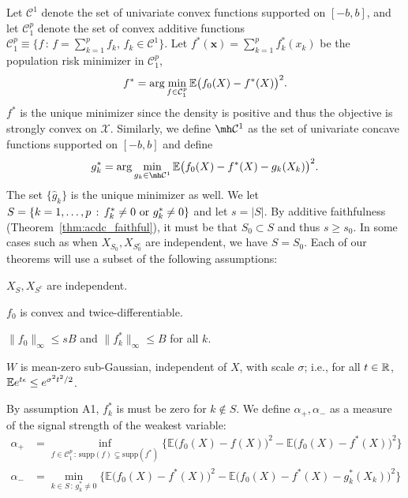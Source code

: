 Let $\mathcal{C}^1$ denote the set of univariate convex functions
supported on $[-b,b]$, 
and let  $\mathcal{C}_1^{p}$ denote the set of convex additive functions
$\mathcal{C}_1^p \equiv \{ f \,:\, f = \sum_{k=1}^p f_k, \,
   f_k \in \mathcal{C}^1 \} $.  
Let $f^*(\mathbf{x}) = \sum_{k=1}^p f^*_k(x_k)$ be the population risk
minimizer in $\mathcal{C}_1^p$, 
\begin{equation}
f^* = \arg\min_{f \in \mathcal{C}_1^p} {\mathbb E}\big(f_0(X) - f^*(X)
\big)^2.
\end{equation}
$f^*$ is the unique minimizer since the density is positive and thus the objective is strongly convex on $\mathcal{X}$. Similarly, we define $\mh \mathcal{C}^1$ as the set of univariate concave functions supported on $[-b, b]$ and define
\begin{equation}
g^*_k = \arg\min_{g_k \in \mh \mathcal{C}^1} \E \big( f_0(X) - f^*(X)
- g_k(X_k) \big)^2.
\end{equation}
The set $\{\hat{g}_k\}$ is the unique minimizer as well. We let $S = \{ k = 1,\ldots,p \,:\, f^*_k \neq 0 \textrm{ or } g^*_k \neq 0\}$ and let $s = |S|$. By additive faithfulness (Theorem~\ref{thm:acdc_faithful}), it must be that $S_0 \subset S$ and thus $s \geq s_0$. In some cases such as when $X_{S_0}, X_{S^c_0}$ are independent, we have $S = S_0$.
Each of our theorems will use a subset of the following assumptions:
\begin{packed_enum}
\item[A1:] $X_S, X_{S^c}$ are independent. 
\item[A2:] $f_0$ is convex and twice-differentiable. 
\item[A3:] $\|f_0\|_\infty \leq sB$ and $\| f^*_k \|_\infty \leq B$ for all $k$.
\item[A4:] $W$ is mean-zero sub-Gaussian, independent of $X$, with scale $\sigma$; i.e., for all $t \in {\mathbb R}$, ${\mathbb E} e^{t \epsilon} \leq e^{\sigma^2 t^2 / 2}$.
\end{packed_enum}
By assumption A1, $f^*_k$ is must be zero for $k\notin S$.
We define $\alpha_{+}, \alpha_{-}$ as a measure of the signal strength of the weakest variable:
\begin{align}
\alpha_{+} &= \inf_{f \in \mathcal{C}_1^p \,:\, \textrm{supp}(f) \subsetneq \textrm{supp}(f^*)} 
       \Big\{ \mathbb{E} \big( f_0(X) - f(X) \big)^2 - 
        \mathbb{E} \big( f_0(X) - f^*(X) \big)^2  \Big\} \label{eqn:signal_level_defn} \\
\alpha_{-} &=   \min_{k \in S \,:\, g^*_k \neq 0}
      \Big\{ \mathbb{E} \big( f_0(X) - f^*(X) \big)^2 - 
    \mathbb{E} \big( f_0(X) - f^*(X) - g^*_k(X_k) \big)^2 \Big\} \nonumber
\end{align}
